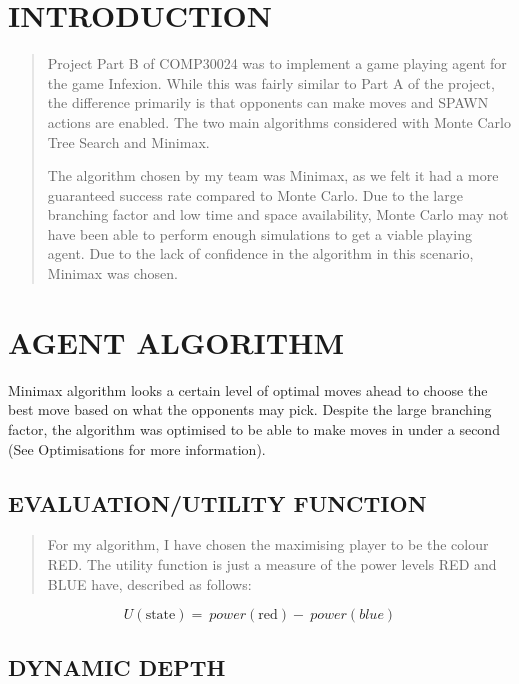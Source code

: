 \documentclass[
]{article}
\author{}
\date{}
\begin{document}
\hypertarget{introduction}{%
\section{INTRODUCTION}\label{introduction}}

\begin{quote}
Project Part B of COMP30024 was to implement a game playing agent for
the game Infexion. While this was fairly similar to Part A of the
project, the difference primarily is that opponents can make moves and
SPAWN actions are enabled. The two main algorithms considered with Monte
Carlo Tree Search and Minimax.

The algorithm chosen by my team was Minimax, as we felt it had a more
guaranteed success rate compared to Monte Carlo. Due to the large
branching factor and low time and space availability, Monte Carlo may
not have been able to perform enough simulations to get a viable playing
agent. Due to the lack of confidence in the algorithm in this scenario,
Minimax was chosen.
\end{quote}

\hypertarget{agent-algorithm}{%
\section{AGENT ALGORITHM}\label{agent-algorithm}}

Minimax algorithm looks a certain level of optimal moves ahead to choose
the best move based on what the opponents may pick. Despite the large
branching factor, the algorithm was optimised to be able to make moves
in under a second (See Optimisations for more information).

\hypertarget{evaluationutility-function}{%
\subsection{EVALUATION/UTILITY
FUNCTION}\label{evaluationutility-function}}

\begin{quote}
For my algorithm, I have chosen the maximising player to be the colour
RED. The utility function is just a measure of the power levels RED and
BLUE have, described as follows:
\end{quote}

\[U\left( \text{state} \right) = \ power\left( \text{red} \right) - \ power(blue)\]

\hypertarget{dynamic-depth}{%
\subsection{\texorpdfstring{DYNAMIC DEPTH
}{DYNAMIC DEPTH }}\label{dynamic-depth}}
\end{document}
